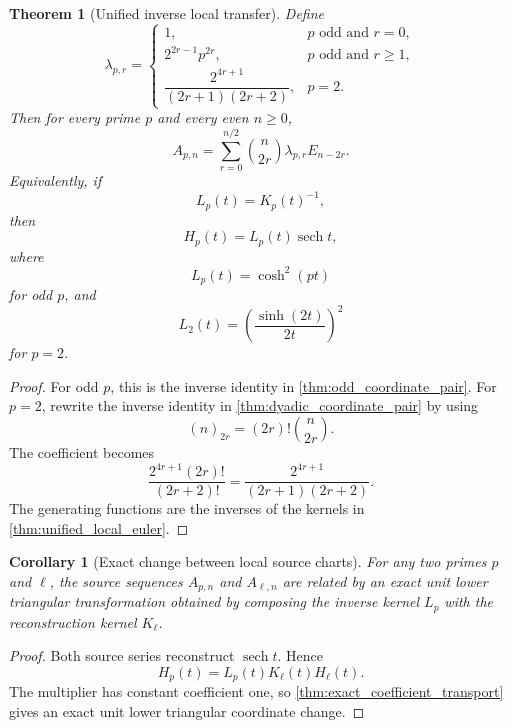 \documentclass{aomart}
\newtheorem{theorem}{Theorem}[section]
\newtheorem{corollary}[corollary]{Corollary}
\theoremstyle{definition}
\theoremstyle{remark}
\newcommand{\fall}[2]{(#1)_{#2}}
\begin{document}
\begin{theorem}[Unified inverse local transfer]\label{thm:unified_inverse_local_euler}
Define
\[
\lambda_{p,r}
=
\begin{cases}
1,&p\text{ odd and }r=0,\\
2^{2r-1}p^{2r},&p\text{ odd and }r\geq1,\\
\dfrac{2^{4r+1}}{(2r+1)(2r+2)},&p=2.
\end{cases}
\]
Then for every prime \(p\) and every even \(n\geq0\),
\[
\boxed{
A_{p,n}
=
\sum_{r=0}^{n/2}
\binom n{2r}
\lambda_{p,r}
E_{n-2r}.
}
\]
Equivalently, if
\[
L_p(t)=K_p(t)^{-1},
\]
then
\[
\boxed{H_p(t)=L_p(t)\operatorname{sech}t,}
\]
where
\[
L_p(t)=\cosh^2(pt)
\]
for odd \(p\), and
\[
L_2(t)=\left(\frac{\sinh(2t)}{2t}\right)^2
\]
for \(p=2\).
\end{theorem}

\begin{proof}
For odd \(p\), this is the inverse identity in \cref{thm:odd_coordinate_pair}. For \(p=2\), rewrite the inverse identity in \cref{thm:dyadic_coordinate_pair} by using
\[
\fall n{2r}=(2r)!\binom n{2r}.
\]
The coefficient becomes
\[
\frac{2^{4r+1}(2r)!}{(2r+2)!}
=
\frac{2^{4r+1}}{(2r+1)(2r+2)}.
\]
The generating functions are the inverses of the kernels in \cref{thm:unified_local_euler}.
\end{proof}

\begin{corollary}[Exact change between local source charts]\label{cor:local_source_change}
For any two primes \(p\) and \(\ell\), the source sequences \(A_{p,n}\) and \(A_{\ell,n}\) are related by an exact unit lower triangular transformation obtained by composing the inverse kernel \(L_p\) with the reconstruction kernel \(K_\ell\).
\end{corollary}

\begin{proof}
Both source series reconstruct \(\operatorname{sech}t\). Hence
\[
H_p(t)=L_p(t)K_\ell(t)H_\ell(t).
\]
The multiplier has constant coefficient one, so \cref{thm:exact_coefficient_transport} gives an exact unit lower triangular coordinate change.
\end{proof}
\end{document}
